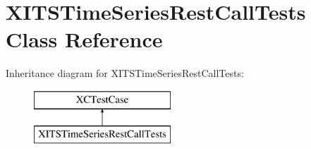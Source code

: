 \hypertarget{interface_x_i_t_s_time_series_rest_call_tests}{}\section{X\+I\+T\+S\+Time\+Series\+Rest\+Call\+Tests Class Reference}
\label{interface_x_i_t_s_time_series_rest_call_tests}
Inheritance diagram for X\+I\+T\+S\+Time\+Series\+Rest\+Call\+Tests\+:\begin{figure}[H]
\begin{center}
\leavevmode
\includegraphics[height=2.000000cm]{interface_x_i_t_s_time_series_rest_call_tests}
\end{center}
\end{figure}
